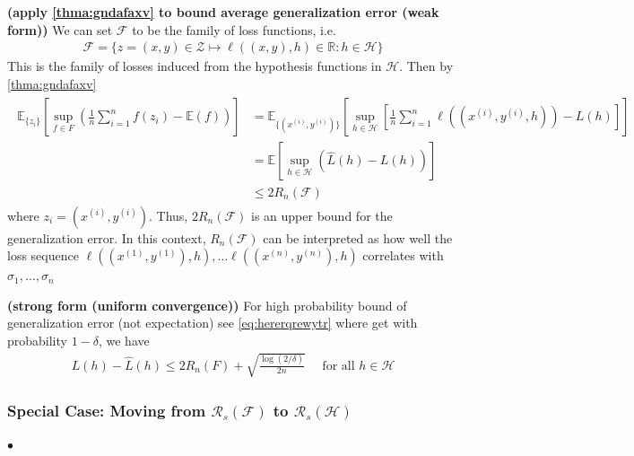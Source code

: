 \documentclass{article}
\newcommand{\bfs}[1]{\textbf{({#1}) }}
\begin{document}
\begin{cora}\bfs{apply \cref{thma:gndafaxv} to bound average generalization error (weak form)}
 We can set $\mathcal{F}$ to be the family of loss functions, i.e.
\begin{align*}
\mathcal{F}=\{z=(x, y) \in \mathcal{Z} \mapsto \ell((x, y), h) \in \mathbb{R}: h \in \mathcal{H}\}
\end{align*}
This is the family of losses induced from the hypothesis functions in $\mathcal{H}$. Then by \cref{thma:gndafaxv}
\begin{align*}
\begin{aligned}
\mathbb{E}_{\{z_{i}\}}\left[\sup _{f \in F}\left(\frac{1}{n} \sum_{i=1}^{n} f\left(z_{i}\right)-\mathbb{E}(f)\right)\right] &=\mathbb{E}_{\{\left(x^{(i)}, y^{(i)}\right)\}}\left[\sup _{h \in \mathcal{H}}\left[\frac{1}{n} \sum_{i=1}^{n} \ell\left(\left(x^{(i)}, y^{(i)}, h\right)\right)-L(h)\right]\right] \\
&=\mathbb{E}\left[\sup _{h \in \mathcal{H}}(\hat{L}(h)-L(h))\right] \\
& \leq 2 R_{n}(\mathcal{F})
\end{aligned}
\end{align*}
where $z_{i}=\left(x^{(i)}, y^{(i)}\right)$. Thus, $2 R_{n}(\mathcal{F})$ is an upper bound for the generalization error. In this context, $R_{n}(\mathcal{F})$ can be interpreted as how well the loss sequence $\ell\left(\left(x^{(1)}, y^{(1)}\right), h\right), \ldots \ell\left(\left(x^{(n)}, y^{(n)}\right), h\right)$ correlates with $\sigma_{1}, \ldots, \sigma_{n}$
\end{cora}
\begin{rema}\bfs{strong form (uniform convergence)}
For high probability bound of generalization error (not expectation) see \cref{eq:hererqrewytr} where get with probability $1-\delta$, we have
\begin{align}
L(h)-\hat{L}(h) \leq 2 R_{n}(F)+\sqrt{\frac{\log (2 / \delta)}{2 n}} \quad \text { for all } h \in \mathcal{H}
\end{align}
\end{rema}

\subsubsection{Special Case: Moving from $\mathcal{R}_{s}(\mathcal{F})$ to $\mathcal{R}_{s}(\mathcal{H})$}

$\bullet$ 
\end{document}
